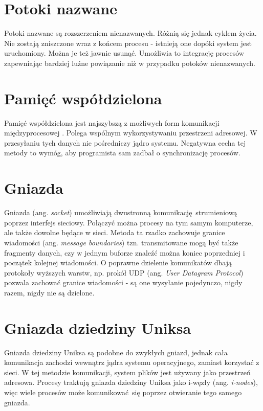 \section{Potoki nazwane}

Potoki nazwane są rozszerzeniem nienazwanych. Różnią się jednak cyklem życia. Nie zostają zniszczone wraz z końcem procesu - istnieją one dopóki system jest uruchomiony. Można je też jawnie usunąć. Umożliwia to integrację procesów zapewniając bardziej luźne powiązanie niż w przypadku potoków nienazwanych.


\section{Pamięć współdzielona}

Pamięć współdzielona jest najszybszą z możliwych form komunikacji międzyprocesowej \cite{Ste92}. Polega wspólnym wykorzystywaniu przestrzeni adresowej. W przesyłaniu tych danych nie pośredniczy jądro systemu. Negatywna cecha tej metody to wymóg, aby programista sam zadbał o synchronizację procesów.


\section{Gniazda}

Gniazda (ang. \textit{socket}) umożliwiają dwustronną komunikację strumieniową poprzez interfejs sieciowy. Połączyć można procesy na tym samym komputerze, ale także dowolne będące w sieci. Metoda ta rzadko zachowuje granice wiadomości (ang. \textit{message boundaries}) tzn. transmitowane mogą być także fragmenty danych, czy w jednym buforze znaleźć można koniec poprzedniej i początek kolejnej wiadomości. O poprawne dzielenie komunikatów dbają protokoły wyższych warstw, np. prokół UDP (ang. \textit{User Datagram Protocol}) pozwala zachować granice wiadomości - są one wysyłanie pojedynczo, nigdy razem, nigdy nie są dzielone.


\section{Gniazda dziedziny Uniksa}

Gniazda dziedziny Uniksa są podobne do zwykłych gniazd, jednak cała komunikacja zachodzi wewnątrz jądra systemu operacyjnego, zamiast korzystać z sieci. W tej metodzie komunikacji, system plików jest używany jako przestrzeń adresowa. Procesy traktują gniazda dziedziny Uniksa jako i-węzły (ang. \textit{i-nodes}), więc wiele procesów może komunikować się poprzez otwieranie tego samego gniazda.



